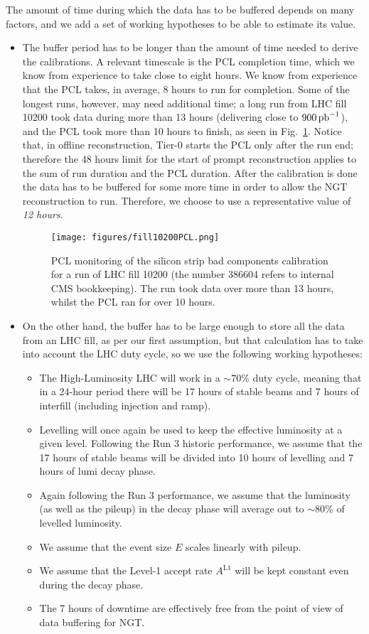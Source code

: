 The amount of time during which the data has to be buffered depends on many factors,
and we add a set of working hypotheses to be able to estimate its value.
\begin{itemize}
\item The buffer period has to be longer than the amount of time needed to derive the calibrations.
A relevant timescale is the PCL completion time, which we know from experience to take close to eight hours.
We know from experience that the PCL takes, in average, 8 hours to run for completion.
Some of the longest runs, however, may need additional time; a long run from LHC fill 10200 took data during more than 13 hours
(delivering close to $900\mbox{\ensuremath{\,\text{pb}^{-1}}}$), and
the PCL took more than 10 hours to finish,
as seen in Fig.~\ref{fig:fill10200PCL}.
Notice that, in offline reconstruction, Tier-0 starts the PCL only after the run end; 
therefore the 48 hours limit for the start of prompt reconstruction applies to 
the sum of run duration and the PCL duration.
After the calibration is done the data has to be buffered for some more time in order to allow the NGT reconstruction to run.
Therefore, we choose to use a representative value of \emph{12 hours}.
\begin{figure}[htbp]
   \centering
	\texttt{[image: figures/fill10200PCL.png]}
   \caption{PCL monitoring of the silicon strip bad components calibration for a run of LHC fill 10200 (the number 386604 refers to internal CMS bookkeeping).
   The run took data over more than 13 hours, whilst the PCL ran for over 10 hours.}
   \label{fig:fill10200PCL}
\end{figure}
\item On the other hand, the buffer has to be large enough to store all the data from an LHC fill, as per our first assumption,
but that calculation has to take into account the LHC duty cycle, so we use the following working hypotheses:
\begin{itemize}
\item The High-Luminosity LHC will work in a $\sim70\%$ duty cycle, meaning that in a 24-hour period there will be 17 hours of stable beams and 7 hours of interfill (including injection and ramp).
\item Levelling will once again be used to keep the effective luminosity at a given level.
Following the Run 3 historic performance, we assume that the 17 hours of stable beams will be divided into 10 hours of levelling and 7 hours of lumi decay phase.
\item Again following the Run 3 performance, we assume that the luminosity (as well as the pileup) in the decay phase will average out to $\sim80\%$ of levelled luminosity.
\item We assume that the event size $E$ scales linearly with pileup.
\item We assume that the Level-1 accept rate $A^{\text{L1}}$ will be kept constant even during the decay phase. 
\item The 7 hours of downtime are effectively free from the point of view of data buffering for NGT.
\end{itemize}
\end{itemize}

